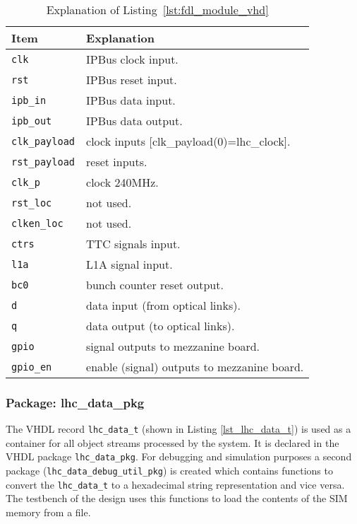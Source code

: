 \medskip
\begin{table}
\footnotesize
\caption{Explanation of Listing~\ref{lst:fdl_module_vhd}}
\vspace{5mm}
\centering
\begin{tabular}{l p{}}
\toprule
{Item} & {Explanation}\\
\midrule
\verb|clk| & IPBus clock input.\\
\verb|rst| & IPBus reset input.\\
\verb|ipb_in| & IPBus data input.\\
\verb|ipb_out| & IPBus data output.\\
\verb|clk_payload| & clock inputs [clk\_payload(0)=lhc\_clock].\\
\verb|rst_payload| & reset inputs.\\
\verb|clk_p| & clock 240MHz.\\
\verb|rst_loc| & not used.\\
\verb|clken_loc| & not used.\\
\verb|ctrs| & TTC signals input.\\
\verb|l1a| & L1A signal input.\\
\verb|bc0| & bunch counter reset output.\\
\verb|d| & data input (from optical links).\\
\verb|q| & data output (to optical links).\\
\verb|gpio| & signal outputs to mezzanine board.\\
\verb|gpio_en| & enable (signal) outputs to mezzanine board.\\
\bottomrule
\end{tabular}
\label{tab:gtl:explanation_fdl_module_vhd}
\end{table}

\clearpage

\subsubsection{Package: lhc\_data\_pkg} \label{sec:fw:section_lhc_data_pkg}

The VHDL record \texttt{lhc\_data\_t} (shown in Listing \ref{lst_lhc_data_t}) is used as a container for all object streams processed by the system. It is declared in the VHDL package \texttt{lhc\_data\_pkg}.
For debugging and simulation purposes a second package (\texttt{lhc\_data\_debug\_util\_pkg}) is created which contains functions to convert the \texttt{lhc\_data\_t} to a hexadecimal string representation and vice versa. The testbench of the design uses this functions to load the contents of the SIM memory from a file.



\clearpage
